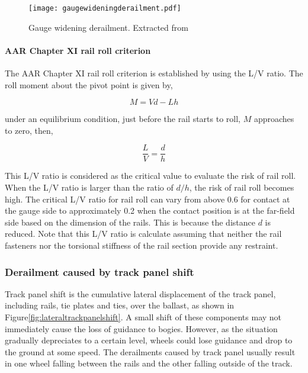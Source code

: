 \begin{figure}[h]
    \centering
    \texttt{[image: gaugewideningderailment.pdf]}
    \caption{Gauge widening derailment. Extracted from \cite[Figure8.18]{iwnicki2006handbook}}
    \label{fig:gaugewideningderailment}
\end{figure}

\paragraph{AAR Chapter XI rail roll criterion}
The AAR Chapter XI rail roll criterion is established by using the L/V ratio. The roll moment about the pivot point is given by,

\begin{equation}
    M=Vd-Lh
\end{equation}

under an equilibrium condition, just before the rail starts to roll, $M$ approaches to zero, then,

\begin{equation}
    \frac{L}{V}=\frac{d}{h}
\end{equation}

This L/V ratio is considered as the critical value to evaluate the risk of rail roll. When the L/V ratio is larger than the ratio of $d/h$, the risk of rail roll becomes high. The critical L/V ratio for rail roll can vary from above 0.6 for contact at the gauge side to approximately 0.2 when the contact position is at the far-field side based on the dimension of the rails. This is because the distance $d$ is reduced. Note that this L/V ratio is calculate assuming that neither the rail fasteners nor the torsional stiffness of the rail section provide any restraint.

\subsubsection{Derailment caused by track panel shift}
Track panel shift is the cumulative lateral displacement of the track panel, including rails, tie plates and ties, over the ballast, as shown in Figure\ref{fig:lateraltrackpanelshift}. A small shift of these components may not immediately cause the loss of guidance to bogies. However, as the situation gradually depreciates to a certain level, wheels could lose guidance and drop to the ground at some speed. The derailments caused by track panel usually result in one wheel falling between the rails and the other falling outside of the track.

